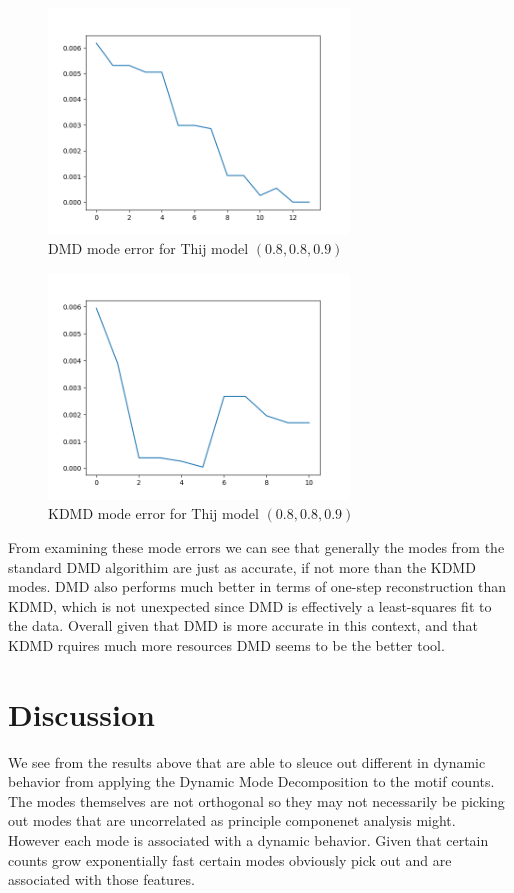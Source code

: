 \begin{figure}
    \includegraphics[width=8cm]{Images/mode_error_dmd_twitter_080809.png}
    \centering
    \caption{DMD mode error for Thij model $(0.8,0.8,0.9)$}
\end{figure}


\begin{figure}
    \includegraphics[width=8cm]{Images/mode_error_kdmd_twitter_080809.png}
    \centering
    \caption{KDMD mode error for Thij model $(0.8,0.8,0.9)$}
\end{figure}

\FloatBarrier

From examining these mode errors we can see that generally the modes
from the standard DMD algorithim are just as accurate, if not more 
than the KDMD modes. DMD also performs much better in terms of one-step
reconstruction than KDMD, which is not unexpected since 
DMD is effectively a least-squares fit to the data. Overall given that 
DMD is more accurate in this context, and that KDMD rquires much
more resources DMD seems to be the better tool.


\chapter{Discussion}
We see from the results above that are able to sleuce out different in dynamic behavior from applying
the Dynamic Mode Decomposition to the motif counts. The modes themselves are not orthogonal so they
may not necessarily be picking out modes that are uncorrelated as principle componenet analysis might. 
However each mode is associated with a dynamic behavior. Given that certain counts grow exponentially 
fast certain modes obviously pick out and are associated with those features.


